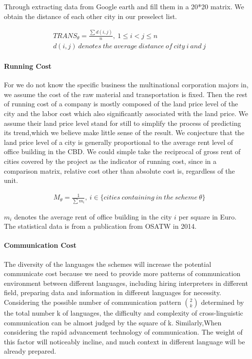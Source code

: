 \documentclass{mcmthesis}
\begin{document}
Through extracting data from Google earth and fill them in a 20*20 matrix. We obtain the distance of each other city in our preselect list.

\begin{align*}
    &TRANS_\theta=\frac{\sum d(i, j)}{n},\ 1\leqslant i<j\leqslant n\\
    &d(i, j)\ denotes\ the\ average\ distance\ of\ city\ i\ and\ j
\end{align*}


\paragraph{Running Cost}
For we do not know the specific business the multinational corporation majors in, we assume the cost of the raw material and transportation is fixed. Then the rest of running cost of a company is mostly composed of the land price level of the city and the labor cost which also significantly associated with the land price. We assume their land price level stand for still to simplify the process of predicting its trend,which we believe make little sense of the result. We conjecture that the land price level of a city is generally proportional to the average rent level of office building in the CBD. We could simple take the reciprocal of gross rent of cities covered by the project as the indicator of running cost, since in a comparison matrix, relative cost other than absolute cost is, regardless of the unit.

\begin{align*}
    &M_\theta=\frac{1}{\sum m_i},\ i\in \{ cities\ containing\ in\ the\ scheme\ \theta\}
\end{align*}

$m_i$ denotes the average rent of office building in the city $i$ per square in Euro. The statistical data is from a publication from OSATW in 2014\cite{wiki:OSATW}.
\paragraph{Communication Cost}
The diversity of the languages the schemes will increase the potential communicate cost because we need to provide more patterns of communication environment between different languages, including hiring interpreters in different field, preparing data and information in different languages for necessity. Considering the possible number of communication pattern $\binom{2}{k}$ determined by the total number k of languages, the difficulty and complexity of cross-linguistic communication can be almost judged by the square of k. Similarly,When considering the rapid advancement technology of communication. The weight of this factor will noticeably incline, and much context in different language will be already prepared.
\end{document}

